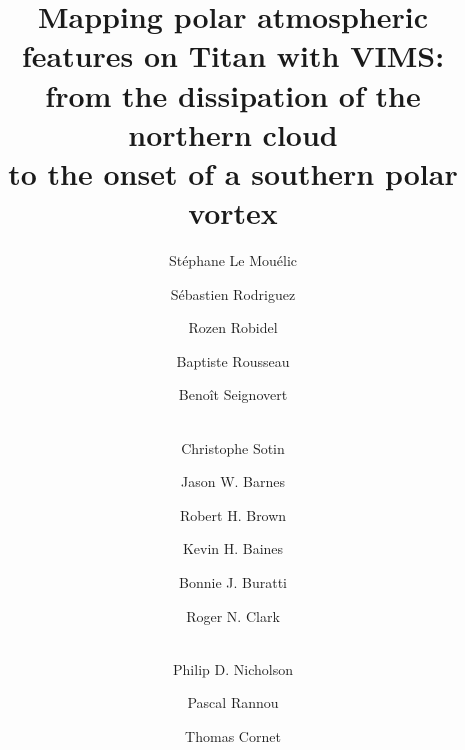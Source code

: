 \documentclass[preprint,twocolumn,5p,authoryear,compress,colorlinks=true]{elsarticle}
\begin{document}
\begin{frontmatter}
\title{Mapping polar atmospheric features on Titan with VIMS:\\from the dissipation of the northern cloud\\to the onset of a southern polar vortex}

\author[LPG]{St\'ephane {Le Mou\'elic}}
\author[IPGP]{S\'ebastien Rodriguez}
\author[LPG]{Rozen Robidel}
\author[IPAG]{Baptiste Rousseau}
\author[LPG]{Beno\^{i}t Seignovert}
\author[JPL]{~\\Christophe Sotin}
\author[DPUI]{Jason W. Barnes}
\author[DPS]{Robert H. Brown}
\author[JPL]{Kevin H. Baines}
\author[JPL]{Bonnie J. Buratti}
\author[PSI]{Roger N. Clark}
\author[Cornell]{~\\Philip D. Nicholson}
\author[GSMA]{Pascal Rannou}
\author[ESAC]{Thomas Cornet}

\address[LPG]{LPG, UMR 6112, CNRS, Universit\'e de Nantes, 2 rue de la Houssini\`ere, 44322 Nantes, France}
\address[IPGP]{IPGP, CNRS-UMR 7154, Universit\'e Paris-Diderot, USPC, Paris, France}
\address[IPAG]{IPAG, CNRS, Universit\'e Grenoble Alpes, 38000 Grenoble, France}
\address[JPL]{Jet Propulsion Laboratory, California Institute of Technology, Pasadena, CA 91109, USA}
\address[DPUI]{Department of Physics, University of Idaho, Engineering-Physics Building, Moscow, ID 83844, USA}
\address[DPS]{Department of Planetary Sciences, University of Arizona, Tucson, AZ 85721, USA}
\address[PSI]{Planetary Science Institute, Tucson, USA}
\address[Cornell]{Department of Astronomy, Cornell University, Ithaca, NY 14853, USA}
\address[GSMA]{GSMA, Universit\'{e} de Reims Champagne-Ardenne, UMR 7331-GSMA, 51687 Reims, France}
\address[ESAC]{European Space Astronomy Centre (ESA/ESAC), Villanueva de la Canada, Madrid, Spain}



\end{frontmatter}
\end{document}
